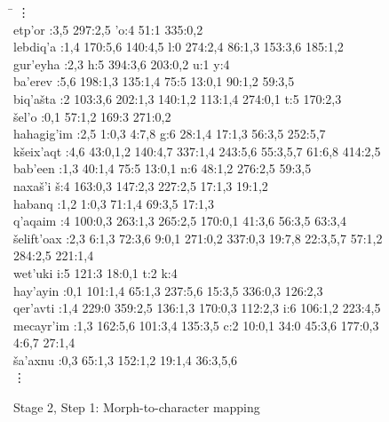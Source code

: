 \begin{figure}[t]
\small
\begin{mdframed}
\begin{tabbing}
\hspace{1in} \= \hspace{5.5in} \kill
 \vdots \> \\
etp\a'{o}r :3,5 297:2,5 \a'{o}:4 51:1 335:0,2\\
lebdiq\a'{a} :1,4 170:5,6 140:4,5 l:0 274:2,4 86:1,3 153:3,6 185:1,2\\
gur\a'{e}yha :2,3 h:5 394:3,6 203:0,2 u:1 y:4\\
ba\a'{e}rev :5,6 198:1,3 135:1,4 75:5 13:0,1 90:1,2 59:3,5\\
biq\a'{a}\v{s}ta :2 103:3,6 202:1,3 140:1,2 113:1,4 274:0,1 t:5 170:2,3\\
\v{s}el\a'{o} :0,1 57:1,2 169:3 271:0,2\\
hahagig\a'{i}m :2,5 1:0,3 4:7,8 g:6 28:1,4 17:1,3 56:3,5 252:5,7\\
k\v{s}eix\a'{a}qt :4,6 43:0,1,2 140:4,7 337:1,4 243:5,6 55:3,5,7 61:6,8 414:2,5\\
bab\a'{e}en :1,3 40:1,4 75:5 13:0,1 n:6 48:1,2 276:2,5 59:3,5\\
naxa\v{s}\a'{i} \> \v{s}:4 163:0,3 147:2,3 227:2,5 17:1,3 19:1,2\\
habanq :1,2 1:0,3 71:1,4 69:3,5 17:1,3\\
q\a'{a}qaim :4 100:0,3 263:1,3 265:2,5 170:0,1 41:3,6 56:3,5 63:3,4\\
\v{s}elift\a'{o}ax :2,3 6:1,3 72:3,6 9:0,1 271:0,2 337:0,3 19:7,8 22:3,5,7 57:1,2 284:2,5 221:1,4\\
wet\a'{u}ki \> i:5 121:3 18:0,1 t:2 k:4\\
hay\a'{a}yin :0,1 101:1,4 65:1,3 237:5,6 15:3,5 336:0,3 126:2,3\\
qer\a'{a}vti :1,4 229:0 359:2,5 136:1,3 170:0,3 112:2,3 i:6 106:1,2 223:4,5\\
mecayr\a'{i}m :1,3 162:5,6 101:3,4 135:3,5 c:2 10:0,1 34:0 45:3,6 177:0,3 4:6,7 27:1,4\\
\v{s}a\a'{a}xnu :0,3 65:1,3 152:1,2 19:1,4 36:3,5,6\\
 \vdots \> \\
\end{tabbing}
\vspace{-0.4cm}
\label{tab:m2c}
\caption{Stage 2, Step 1: Morph-to-character mapping}
\end{mdframed}
\end{figure}
